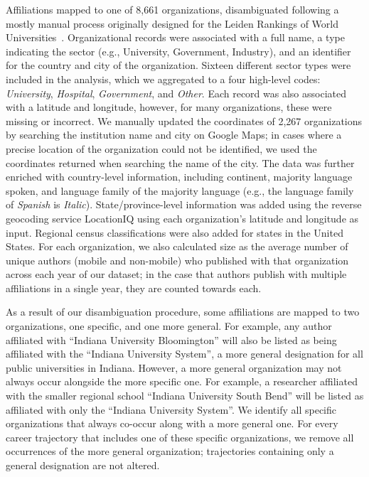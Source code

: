 \documentclass[12pt]{article} %
\begin{document}
Affiliations mapped to one of 8,661 organizations, disambiguated following a mostly manual process originally designed for the Leiden Rankings of World Universities~\autocite{waltman2012leidenrankings}.
Organizational records were associated with a full name, a type indicating the sector (e.g., University, Government, Industry), and an identifier for the country and city of the organization.
Sixteen different sector types were included in the analysis, which we aggregated to a four high-level codes: \textit{University}, \textit{Hospital}, \textit{Government}, and \textit{Other}.
Each record was also associated with a latitude and longitude, however, for many organizations, these were missing or incorrect. We manually updated the coordinates of 2,267 organizations by searching the institution name and city on Google Maps;
in cases where a precise location of the organization could not be identified, we used the coordinates returned when searching the name of the city.
The data was further enriched with country-level information, including continent, majority language spoken, and language family of the majority language (e.g., the language family of \textit{Spanish} is \textit{Italic}).
State/province-level information was added using the reverse geocoding service LocationIQ using each organization's latitude and longitude as input.
Regional census classifications were also added for states in the United States.
For each organization, we also calculated size as the average number of unique authors (mobile and non-mobile) who published with that organization across each year of our dataset;
in the case that authors publish with multiple affiliations in a single year, they are counted towards each.

As a result of our disambiguation procedure, some affiliations are mapped to two organizations, one specific, and one more general.
For example, any author affiliated with ``Indiana University Bloomington'' will also be listed as being affiliated with the ``Indiana University System'', a more general designation for all public universities in Indiana.
However, a more general organization may not always occur alongside the more specific one.
For example, a researcher affiliated with the smaller regional school ``Indiana University South Bend'' will be listed as affiliated with only the ``Indiana University System''.
We identify all specific organizations that always co-occur along with a more general one.
For every career trajectory that includes one of these specific organizations, we remove all occurrences of the more general organization;
trajectories containing only a general designation are not altered.
\end{document}
